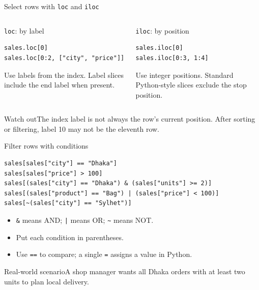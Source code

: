 \documentclass[aspectratio=169,10pt]{beamer}
\newcommand{\scenario}[1]{\begin{block}{Real-world scenario}#1\end{block}}
\newcommand{\pitfall}[1]{\begin{alertblock}{Watch out}#1\end{alertblock}}
\begin{document}
\begin{frame}[fragile]{Select rows with \texttt{loc} and \texttt{iloc}}
\begin{columns}[T,onlytextwidth]
\begin{block}{\texttt{loc}: by label}
\begin{lstlisting}
sales.loc[0]
sales.loc[0:2, ["city", "price"]]
\end{lstlisting}
Use labels from the index. Label slices include the end label when present.
\end{block}
\begin{block}{\texttt{iloc}: by position}
\begin{lstlisting}
sales.iloc[0]
sales.iloc[0:3, 1:4]
\end{lstlisting}
Use integer positions. Standard Python-style slices exclude the stop position.
\end{block}
\end{columns}
\pitfall{The index label is not always the row's current position. After sorting or filtering, label 10 may not be the eleventh row.}
\end{frame}

\begin{frame}[fragile]{Filter rows with conditions}
\begin{lstlisting}
sales[sales["city"] == "Dhaka"]
sales[sales["price"] > 100]
sales[(sales["city"] == "Dhaka") & (sales["units"] >= 2)]
sales[(sales["product"] == "Bag") | (sales["price"] < 100)]
sales[~(sales["city"] == "Sylhet")]
\end{lstlisting}
\begin{itemize}
\item \texttt{\&} means AND; \texttt{|} means OR; \texttt{\~{}} means NOT.
\item Put each condition in parentheses.
\item Use \texttt{==} to compare; a single \texttt{=} assigns a value in Python.
\end{itemize}
\scenario{A shop manager wants all Dhaka orders with at least two units to plan local delivery.}
\end{frame}
\end{document}
